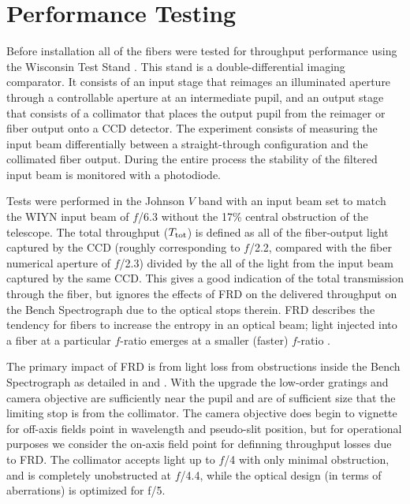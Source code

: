 \chapter{\GP Performance Testing}
\label{chap:GPtestig}

Before installation all of the \GP fibers were tested for throughput
performance using the Wisconsin Test Stand
\citep{Bershady04,Crause08,Eigenbrot12}. This stand is a
double-differential imaging comparator. It consists of an input stage
that reimages an illuminated aperture through a controllable aperture
at an intermediate pupil, and an output stage that consists of a
collimator that places the output pupil from the reimager or fiber
output onto a CCD detector. The experiment consists of measuring the
input beam differentially between a straight-through configuration and
the collimated fiber output. During the entire process the stability
of the filtered input beam is monitored with a photodiode.

Tests were performed in the Johnson $V$ band with an input beam set to
match the WIYN input beam of $f$/6.3 without the 17\% central
obstruction of the telescope. The total throughput ($T_{\rm tot}$) is
defined as all of the fiber-output light captured by the CCD (roughly
corresponding to $f$/2.2, compared with the fiber numerical aperture
of $f$/2.3)
divided by the all of the light from the input beam captured by the
same CCD. This gives a good indication of the total transmission
through the fiber, but ignores the effects of FRD on the delivered
throughput on the Bench Spectrograph due to the optical stops
therein. FRD describes the tendency for fibers to increase the entropy
in an optical beam; light injected into a fiber at a particular
$f$-ratio emerges at a smaller (faster) $f$-ratio \citep{Angel77}.

The primary impact of FRD is from light loss from obstructions inside
the Bench Spectrograph as detailed in \cite{Bershady04} and
\cite{Bershady05}.  With the upgrade \citep{Bershady08} the low-order
gratings and camera objective are sufficiently near the pupil and are
of sufficient size that the limiting stop is from the collimator. The
camera objective does begin to vignette for off-axis fields point in
wavelength and pseudo-slit position, but for operational purposes we
consider the on-axis field point for definning throughput losses due
to FRD.  The collimator accepts light up to $f$/4 with only minimal
obstruction, and is completely unobstructed at $f$/4.4, while the
optical design (in terms of aberrations) is optimized for f/5.

